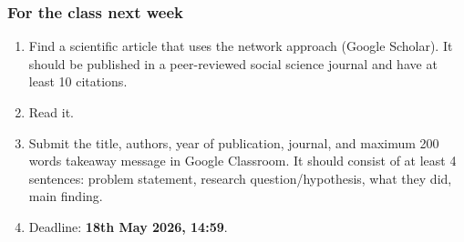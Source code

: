 \documentclass[aspectratio=169]{beamer}
\begin{document}
\begin{frame}
    \frametitle{For the class next week}
    \begin{enumerate}
        \item Find a scientific article that uses the network approach (Google Scholar). It should be published in a peer-reviewed social science journal and have at least 10 citations.
        \item Read it.
        \item Submit the title, authors, year of publication, journal, and maximum 200 words takeaway message in Google Classroom. It should consist of at least 4 sentences: problem statement, research question/hypothesis, what they did, main finding.
        \item Deadline: \textbf{18th May 2026, 14:59}.
    \end{enumerate}
\end{frame}
\end{document}
